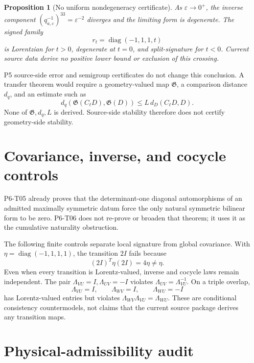 \documentclass[11pt]{article}
\newtheorem{proposition}[theorem]{Proposition}
\newcommand{\diag}{\operatorname{diag}}
\begin{document}
\begin{proposition}[No uniform nondegeneracy certificate]
As \(\varepsilon\to0^+\), the inverse component
\((q_{a,\varepsilon}^{-1})^{33}=\varepsilon^{-2}\) diverges and the limiting
form is degenerate. The signed family
\[
 r_t=\diag(-1,1,1,t)
\]
is Lorentzian for \(t>0\), degenerate at \(t=0\), and split-signature for
\(t<0\). Current source data derive no positive lower bound or exclusion of
this crossing.
\end{proposition}

P5 source-side error and semigroup certificates do not change this
conclusion. A transfer theorem would require a geometry-valued map
\(\mathfrak G\), a comparison distance \(d_q\), and an estimate such as
\[
 d_q\!\left(\mathfrak G(C_\ell D),\mathfrak G(D)\right)
 \le L\,d_D(C_\ell D,D).
\]
None of \(\mathfrak G,d_q,L\) is derived. Source-side stability therefore
does not certify geometry-side stability.

\section{Covariance, inverse, and cocycle controls}

P6-T05 already proves that the determinant-one diagonal automorphisms of an
admitted maximally symmetric datum force the only natural symmetric bilinear
form to be zero. P6-T06 does not re-prove or broaden that theorem; it uses it
as the cumulative naturality obstruction.

The following finite controls separate local signature from global
covariance. With
\(\eta=\diag(-1,1,1,1)\), the transition \(2I\) fails because
\[
 (2I)^T\eta(2I)=4\eta\ne\eta.
\]
Even when every transition is Lorentz-valued, inverse and cocycle laws remain
independent. The pair
\(\Lambda_{VU}=I,\Lambda_{UV}=-I\) violates
\(\Lambda_{UV}=\Lambda_{VU}^{-1}\). On a triple overlap,
\[
 \Lambda_{VU}=I,\qquad \Lambda_{WV}=I,\qquad
 \Lambda_{WU}=-I
\]
has Lorentz-valued entries but violates
\(\Lambda_{WV}\Lambda_{VU}=\Lambda_{WU}\).
These are conditional consistency countermodels, not claims that the current
source package derives any transition maps.

\section{Physical-admissibility audit}
\end{document}
